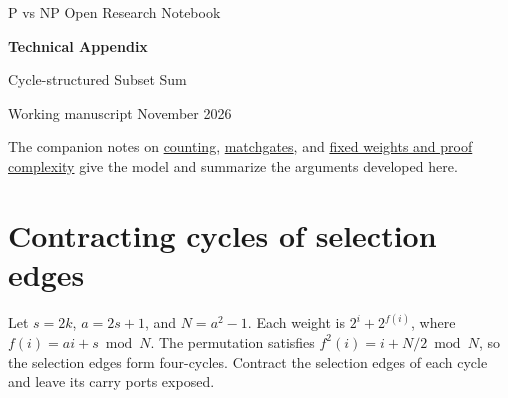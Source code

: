 \documentclass[11pt,a4paper]{article}
\numberwithin{equation}{section}
\begin{document}
\begin{center}
  {\small P vs NP Open Research Notebook\par}
  \vspace{0.6em}
  {\LARGE\bfseries Technical Appendix\par}
  \vspace{0.35em}
  {\large Cycle-structured Subset Sum\par}
  \vspace{0.6em}
  {\small Working manuscript \enspace\textbar{} November 2026\par}
\end{center}

\begin{abstract}
This appendix develops the supporting arguments for the notebook's work on
Subset Sum with two set bits per weight and two weights incident
to each column. It covers carry contraction, matchgate representations,
parameterized counting, and circuit lower bounds. The arguments were
developed by OpenAI's ChatGPT/Codex in the investigation initiated and
directed by Leonardo, who maintains the notebook. Independent proof
review is pending. The sections identify finite checks by scope, and the
\href{https://github.com/Leonardo-Italia/p-vs-np-open-notebook}{repository} identifies the checks that can be rerun
with \texttt{verify.py}.
\end{abstract}

\noindent The companion notes on
\href{https://github.com/Leonardo-Italia/p-vs-np-open-notebook/blob/b07860a0b854bd3f898114aa6a2476fcbab1cf56/research/02-counting-and-parameters.md}{counting},
\href{https://github.com/Leonardo-Italia/p-vs-np-open-notebook/blob/b07860a0b854bd3f898114aa6a2476fcbab1cf56/research/03-matchgate-representations.md}{matchgates}, and
\href{https://github.com/Leonardo-Italia/p-vs-np-open-notebook/blob/b07860a0b854bd3f898114aa6a2476fcbab1cf56/research/04-fixed-weights-and-proofs.md}{fixed weights and proof complexity}
give the model and summarize the arguments developed here.

\tableofcontents
\clearpage

\section{Contracting cycles of selection edges}\label{contracting-cycles-of-selection-edges}

Let \(s=2k\), \(a=2s+1\), and \(N=a^2-1\). Each weight is \(2^i+2^{f(i)}\), where \(f(i)=ai+s\bmod N\). The permutation satisfies \(f^2(i)=i+N/2\bmod N\), so the selection edges form four-cycles. Contract the selection edges of each cycle and leave its carry ports exposed.
\end{document}

